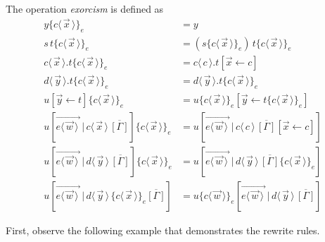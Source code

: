\documentclass[a4paper,UKenglish,cleveref, autoref]{lipics-v2019}
\newcommand{\app}[2]{#1 \, #2}
\newcommand{\fake}[3]{#1 \langle \, #2 \, \rangle . #3}
\newcommand{\share}[3]{#1 [#2 \leftarrow #3]}
\newcommand{\dist}[5]{#1 [ #2 \, \vert \, \fakedist{#4}{#5} \, #3 ]}
\newcommand{\fakedist}[2]{#1 \langle \, #2 \, \rangle}
\newcommand{\vecdist}[2]{\overrightarrow{\fakedist{#1}{#2} \,}}
\newcommand{\exor}[3]{#1 \{ \fakedist{#2}{#3} \}_{e}}
\begin{document}
\begin{definition}[Exorcism] The operation \emph{exorcism} is defined as
\label{def:exor}
\begingroup
\allowdisplaybreaks
	\begin{align*}
		\exor{y}{c}{\vec{x}} 	&= y \\
		\exor{\app{s}{t}}{c}{\vec{x}} &= \app{(\exor{s}{c}{\vec{x}})}{\exor{t}{c}{\vec{x}}} \\
		\exor{\fake{c}{\vec{x}}{t}}{c}{\vec{x}} &= \fake{c}{c}{\share{t}{\vec{x}}{c}} \\
		\exor{\fake{d}{\vec{y}}{t}}{c}{\vec{x}} &= \fake{d}{\vec{y}}{\exor{t}{c}{\vec{x}}}\\
		\exor{\share{u}{\vec{y}}{t}}{c}{\vec{x}} &= \share{\exor{u}{c}{\vec{x}}}{\vec{y}}{\exor{t}{c}{\vec{x}}} \\
		\exor{\dist{u}{\vecdist{e}{\vec{w}}}{\overline{[\Gamma]}}{c}{\vec{x}}}{c}{\vec{x}} &= \dist{u}{\vecdist{e}{\vec{w}}}{\overline{[\Gamma]} \share{}{\vec{x}}{c}}{c}{c} \\
		\exor{\dist{u}{\vecdist{e}{\vec{w}}}{\overline{[\Gamma]}}{d}{\vec{y}}}{c}{\vec{x}} &= \dist{u}{\vecdist{e}{\vec{w}}}{\exor{\overline{[\Gamma]}}{c}{\vec{x}}}{d}{\vec{y}} \\
		\dist{u}{\vecdist{e}{\vec{w}}}{ \exor{}{c}{\vec{x}} \overline{[\Gamma]}}{d}{\vec{y}} &= \dist{\exor{u}{c}{\vec{w}}}{\vecdist{e}{\vec{w}}}{\overline{[\Gamma]}}{d}{\vec{y}}
	\end{align*}
\endgroup
\end{definition}

First, observe the following example that demonstrates the rewrite rules. 
\end{document}
